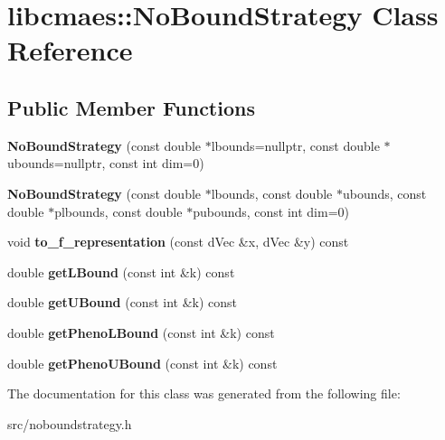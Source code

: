 \hypertarget{classlibcmaes_1_1NoBoundStrategy}{\section{libcmaes\-:\-:No\-Bound\-Strategy Class Reference}
\label{classlibcmaes_1_1NoBoundStrategy}
}
\subsection*{Public Member Functions}
\begin{DoxyCompactItemize}
\item 
\hypertarget{classlibcmaes_1_1NoBoundStrategy_a726bc7b1e9f5dbde5ad97757ed94e470}{{\bfseries No\-Bound\-Strategy} (const double $\ast$lbounds=nullptr, const double $\ast$ubounds=nullptr, const int dim=0)}\label{classlibcmaes_1_1NoBoundStrategy_a726bc7b1e9f5dbde5ad97757ed94e470}

\item 
\hypertarget{classlibcmaes_1_1NoBoundStrategy_ab0c440259f9f29e384a671dc00dd1edc}{{\bfseries No\-Bound\-Strategy} (const double $\ast$lbounds, const double $\ast$ubounds, const double $\ast$plbounds, const double $\ast$pubounds, const int dim=0)}\label{classlibcmaes_1_1NoBoundStrategy_ab0c440259f9f29e384a671dc00dd1edc}

\item 
\hypertarget{classlibcmaes_1_1NoBoundStrategy_a766c30a177076c46b89be463ce1f3062}{void {\bfseries to\-\_\-f\-\_\-representation} (const d\-Vec \&x, d\-Vec \&y) const }\label{classlibcmaes_1_1NoBoundStrategy_a766c30a177076c46b89be463ce1f3062}

\item 
\hypertarget{classlibcmaes_1_1NoBoundStrategy_a9f2fe5e1b64188118add2e8e00603ba3}{double {\bfseries get\-L\-Bound} (const int \&k) const }\label{classlibcmaes_1_1NoBoundStrategy_a9f2fe5e1b64188118add2e8e00603ba3}

\item 
\hypertarget{classlibcmaes_1_1NoBoundStrategy_a2a0a9467aeb6b57749cc73499bf40620}{double {\bfseries get\-U\-Bound} (const int \&k) const }\label{classlibcmaes_1_1NoBoundStrategy_a2a0a9467aeb6b57749cc73499bf40620}

\item 
\hypertarget{classlibcmaes_1_1NoBoundStrategy_a5b2514ff34ef3e7a5392a615cbdb2b45}{double {\bfseries get\-Pheno\-L\-Bound} (const int \&k) const }\label{classlibcmaes_1_1NoBoundStrategy_a5b2514ff34ef3e7a5392a615cbdb2b45}

\item 
\hypertarget{classlibcmaes_1_1NoBoundStrategy_a324683037bd85f4e03c2fc2d5ea624ff}{double {\bfseries get\-Pheno\-U\-Bound} (const int \&k) const }\label{classlibcmaes_1_1NoBoundStrategy_a324683037bd85f4e03c2fc2d5ea624ff}

\end{DoxyCompactItemize}


The documentation for this class was generated from the following file\-:\begin{DoxyCompactItemize}
\item 
src/noboundstrategy.\-h\end{DoxyCompactItemize}
